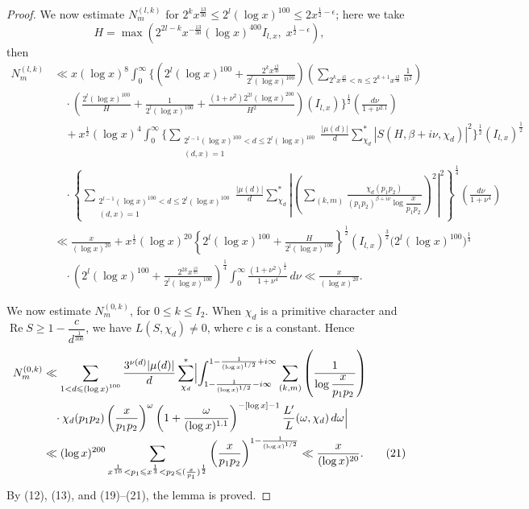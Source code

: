 \begin{proof}
We now estimate $N_m^{(l,k)}$ for $2^kx^{\frac{13}{30}}\leqslant2^l(\log x)^{100}\leqslant2x^{\frac12-\epsilon}$; here we take
\[
H=\max\left(2^{2l-k}x^{-\frac{13}{30}}(\log x)^{400}I_{l,x},\;x^{\frac12-\epsilon}\right),
\]
then
\begin{align*}
N_m^{(l,k)}&\ll x(\log x)^8\int_0^{\infty}\Biggl\{\left(2^l(\log x)^{100}+\frac{2^kx^{\frac{13}{30}}}{2^l(\log x)^{100}}\right)\left(\sum_{2^kx^{\frac{13}{30}}<n\leqslant2^{k+1}x^{\frac{13}{30}}}\frac1{n^2}\right)\\
&\quad\cdot\left(\frac{2^l(\log x)^{100}}H+\frac1{2^l(\log x)^{100}}+\frac{(1+\nu^2)2^{2l}(\log x)^{200}}{H^2}\right)(I_{l,x})\Biggr\}^{\frac12}\left(\frac{d\nu}{1+\nu^{2.1}}\right)\\
&\quad+x^{\frac12}(\log x)^4\int_0^{\infty}\Biggl\{\sum_{\substack{2^{l-1}(\log x)^{100}<d\leqslant2^l(\log x)^{100}\\(d,x)=1}}\frac{|\mu(d)|}{d}\sum_{\chi_d}^{*}|S(H,\beta+i\nu,\chi_d)|^2\Biggr\}^{\frac12}(I_{l,x})^{\frac12}\\
&\quad\cdot\left\{\sum_{\substack{2^{l-1}(\log x)^{100}<d\leqslant2^l(\log x)^{100}\\(d,x)=1}}\frac{|\mu(d)|}{d}\sum_{\chi_d}^{*}\left|\left(\sum_{(k,m)}\frac{\chi_d(p_1p_2)}{(p_1p_2)^{\beta+i\nu}\log\dfrac{x}{p_1p_2}}\right)^2\right|^2\right\}^{\frac14}\left(\frac{d\nu}{1+\nu^4}\right)\\
&\ll\frac{x}{(\log x)^{20}}+x^{\frac12}(\log x)^{20}\left\{2^l(\log x)^{100}+\frac{H}{2^l(\log x)^{100}}\right\}^{\frac12}(I_{l,x})^{\frac32}\bigl(2^l(\log x)^{100}\bigr)^{\frac14}\\
&\quad\cdot\left(2^l(\log x)^{100}+\frac{2^{2k}x^{\frac{13}{15}}}{2^l(\log x)^{100}}\right)^{\frac14}\int_0^{\infty}\frac{(1+\nu^2)^{\frac14}}{1+\nu^4}\,d\nu\ll\frac{x}{(\log x)^{20}}.\tag{20}
\end{align*}

We now estimate $N_m^{(0,k)}$, for $0\leqslant k\leqslant I_2$. When $\chi_d$ is a primitive character and $\operatorname{Re}S\geqslant1-\dfrac{c}{d^{\frac1{300}}}$, we have $L(S,\chi_d)\neq0$, where $c$ is a constant. Hence
\begin{align*}
N_m^{(0,k)}&\ll\sum_{\substack{1<d\leqslant(\log x)^{100}}}\frac{3^{\nu(d)}|\mu(d)|}{d}\sum_{\chi_d}^{*}\Bigl|\int_{1-\frac1{(\log x)^{1/2}}-i\infty}^{1-\frac1{(\log x)^{1/2}}+i\infty}\sum_{(k,m)}\left(\frac1{\log\dfrac{x}{p_1p_2}}\right)\\
&\quad\cdot\chi_d(p_1p_2)\left(\frac{x}{p_1p_2}\right)^\omega\left(1+\frac{\omega}{(\log x)^{1.1}}\right)^{-[\log x]-1}\frac{L'}{L}(\omega,\chi_d)\,d\omega\Bigr|\\
&\ll(\log x)^{200}\sum_{x^{\frac1{10}}<p_1\leqslant x^{\frac13}<p_2\leqslant(\frac{x}{p_1})^{\frac12}}\left(\frac{x}{p_1p_2}\right)^{1-\frac1{(\log x)^{1/2}}}\ll\frac{x}{(\log x)^{20}}.\tag{21}
\end{align*}
By (12), (13), and (19)--(21), the lemma is proved.
\end{proof}


